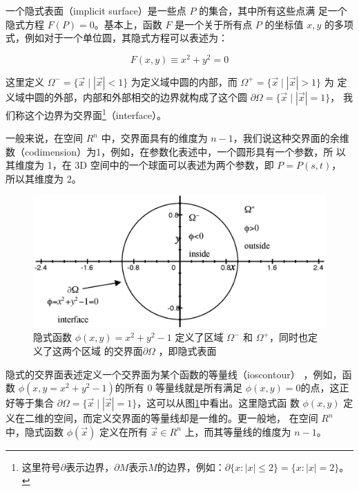 一个隐式表面（implicit surface）是一些点 $P$ 的集合，其中所有这些点满 足一个隐式方程 $F(P) = 0$。基本上，函数 $F$ 是一个关于所有点 $P$ 的坐标值 $x,y$ 的多项式，例如对于一个单位圆，其隐式方程可以表述为：

\begin{equation}
	F(x,y)\equiv x^{2}+y^{2}=0
\end{equation}

这里定义 $\Omega^{−} = \{\vec{x}\mid|\vec{x}| < 1\}$ 为定义域中圆的内部，而 $\Omega^{+} = \{\vec{x}\mid|\vec{x}| > 1\}$ 为 定义域中圆的外部，内部和外部相交的边界就构成了这个圆 $\partial\Omega= \{\vec{x}\mid|\vec{x}| = 1\}$， 我们称这个边界为交界面\footnote{这里符号$\partial$表示边界，$\partial M$表示$M$的边界，例如：$\partial\{x:|x|≤2\}=\{x:|x|=2\}$。}（interface）。

一般来说，在空间 $R^{n}$ 中，交界面具有的维度为 $n−1$，我们说这种交界面的余维数（codimension）为1，例如，在参数化表述中，一个圆形具有一个参数，所 以其维度为 1，在 3D 空间中的一个球面可以表述为两个参数，即 $P = P (s, t)$， 所以其维度为 2。

\begin{figure}
	\includegraphics[width=\textwidth]{figures/df/implicit-function}
	\caption{隐式函数 $\phi(x, y) = x^{2} + y^{2} − 1$ 定义了区域 $\Omega^{−}$ 和 $\Omega^{+}$，同时也定义了这两个区域 的交界面$\partial\Omega$ ，即隐式表面}
	\label{f:df-implicit-function}
\end{figure}

隐式的交界面表述定义一个交界面为某个函数的等量线（ioscontour） ，例如，函数 $\phi(x,y=x^{2}+y^{2}-1) $的所有 0 等量线就是所有满足 $\phi(x,y) = 0$的点，这正好等于集合 $\partial\Omega = \{\vec{x}\mid |\vec{x}| = 1\}$，这可以从图\ref{f:df-implicit-function}中看出。这里隐式函 数 $\phi(x,y)$ 定义在二维的空间，而定义交界面的等量线却是一维的。更一般地， 在空间 $R^{n}$ 中，隐式函数 $\phi(\vec{x})$ 定义在所有 $\vec{x} \in R^{n}$ 上，而其等量线的维度为 $n − 1$。

